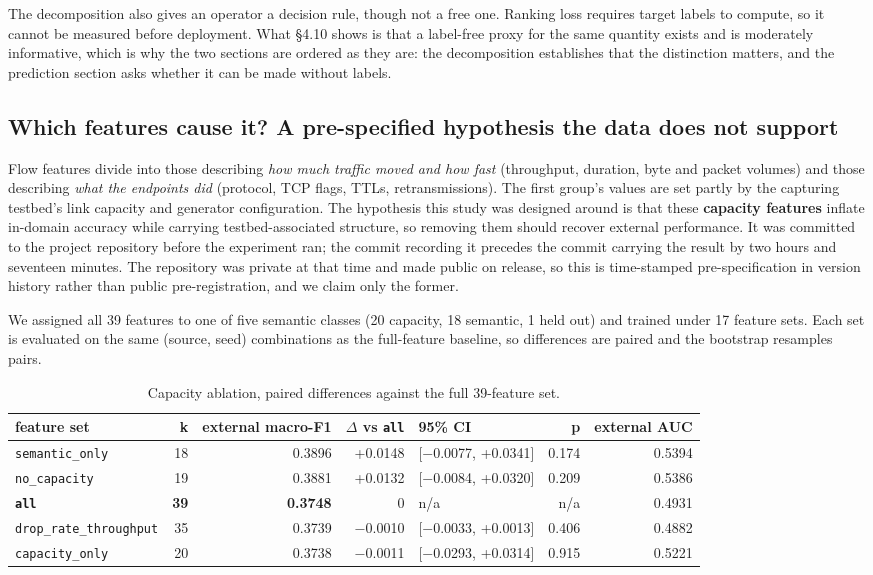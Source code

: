 \documentclass[journal]{IEEEtran}
\begin{document}
The decomposition also gives an operator a decision rule, though not a free one. Ranking loss requires target labels to compute, so it cannot be measured before deployment. What §4.10 shows is that a label-free proxy for the same quantity exists and is moderately informative, which is why the two sections are ordered as they are: the decomposition establishes that the distinction matters, and the prediction section asks whether it can be made without labels.

\subsection{Which features cause it? A pre-specified hypothesis the data does not support}

Flow features divide into those describing \emph{how much traffic moved and how fast} (throughput, duration, byte and packet volumes) and those describing \emph{what the endpoints did} (protocol, TCP flags, TTLs, retransmissions). The first group's values are set partly by the capturing testbed's link capacity and generator configuration. The hypothesis this study was designed around is that these \textbf{capacity features} inflate in-domain accuracy while carrying testbed-associated structure, so removing them should recover external performance. It was committed to the project repository before the experiment ran; the commit recording it precedes the commit carrying the result by two hours and seventeen minutes. The repository was private at that time and made public on release, so this is time-stamped pre-specification in version history rather than public pre-registration, and we claim only the former.

We assigned all 39 features to one of five semantic classes (20 capacity, 18 semantic, 1 held out) and trained under 17 feature sets. Each set is evaluated on the same (source, seed) combinations as the full-feature baseline, so differences are paired and the bootstrap resamples pairs.

\begin{table}[htbp]\centering\scriptsize
\caption{Capacity ablation, paired differences against the full 39-feature set.}
\begin{tabular}{lrrrlrr}
\toprule
feature set & k & external macro-F1 & $\Delta$ vs \texttt{all} & 95\% CI & p & external AUC \\
\midrule
\texttt{semantic\_only} & 18 & 0.3896 & +0.0148 & [$-$0.0077, +0.0341] & 0.174 & 0.5394 \\
\texttt{no\_capacity} & 19 & 0.3881 & +0.0132 & [$-$0.0084, +0.0320] & 0.209 & 0.5386 \\
\textbf{\texttt{all}} & \textbf{39} & \textbf{0.3748} & 0 & n/a & n/a & 0.4931 \\
\texttt{drop\_rate\_throughput} & 35 & 0.3739 & $-$0.0010 & [$-$0.0033, +0.0013] & 0.406 & 0.4882 \\
\texttt{capacity\_only} & 20 & 0.3738 & $-$0.0011 & [$-$0.0293, +0.0314] & 0.915 & 0.5221 \\
\bottomrule
\end{tabular}
\end{table}
\end{document}
